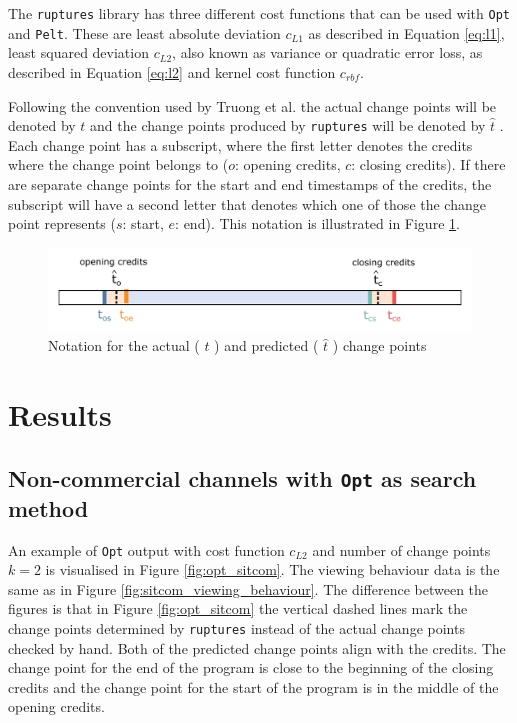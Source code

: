 The \texttt{ruptures} library has three different cost functions that can be used with \texttt{Opt} and \texttt{Pelt}. These are least absolute deviation $c_{L1}$ as described in Equation \ref{eq:l1}, least squared deviation $c_{L2}$, also known as variance or quadratic error loss, as described in Equation \ref{eq:l2} and kernel cost function $c_{rbf}$. %

Following the convention used by Truong et al. the actual change points will be denoted by $t$ and the change points produced by \texttt{ruptures} will be denoted by $\hat{t}$ \cite{truongSelectiveReviewOffline2020}. Each change point has a subscript, where the first letter denotes the credits where the change point belongs to ($o$: opening credits, $c$: closing credits). If there are separate change points for the start and end timestamps of the credits, the subscript will have a second letter that denotes which one of those the change point represents ($s$: start, $e$: end). This notation is illustrated in Figure \ref{fig:change_point_notation}.

\begin{figure}[H]
    \centering
    \includegraphics[width=1\textwidth]{../plots/timeline.pdf}
    \caption{Notation for the actual ( $t$ ) and predicted ( $\hat{t}$ ) change points}
    \label{fig:change_point_notation}
\end{figure}

\section{Results} \label{sec:results}

\subsection{Non-commercial channels with \texttt{Opt} as search method} \label{sec:results_opt}

An example of \texttt{Opt} output with cost function $c_{L2}$ and number of change points $k=2$ is visualised in Figure \ref{fig:opt_sitcom}. The viewing behaviour data is the same as in Figure \ref{fig:sitcom_viewing_behaviour}. The difference between the figures is that in Figure \ref{fig:opt_sitcom} the vertical dashed lines mark the change points determined by \texttt{ruptures} instead of the actual change points checked by hand. Both of the predicted change points align with the credits. The change point for the end of the program is close to the beginning of the closing credits and the change point for the start of the program is in the middle of the opening credits.

